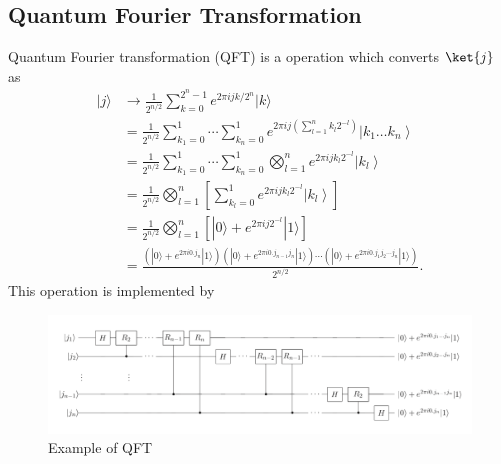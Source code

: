 \documentclass[b5paper,papersize,dvipdfmx,fleqn]{article}
\begin{document}
\subsection{Quantum Fourier Transformation}
Quantum Fourier transformation (QFT) is a operation which converts $\ket{j}$ as
$$
\begin{aligned}
|j\rangle & \rightarrow \frac{1}{2^{n / 2}} \sum_{k=0}^{2^{n}-1} e^{2 \pi i j k / 2^{n}}|k\rangle \\
&=\frac{1}{2^{n / 2}} \sum_{k_{1}=0}^{1} \cdots \sum_{k_{n}=0}^{1} e^{2 \pi i j\left(\sum_{l=1}^{n} k_{l} 2^{-l}\right)}\left|k_{1} \ldots k_{n}\right\rangle \\
&=\frac{1}{2^{n / 2}} \sum_{k_{1}=0}^{1} \cdots \sum_{k_{n}=0}^{1} \bigotimes_{l=1}^{n} e^{2 \pi i j k_{l} 2^{-l}}\left|k_{l}\right\rangle \\
&=\frac{1}{2^{n / 2}} \bigotimes_{l=1}^{n}\left[\sum_{k_{l}=0}^{1} e^{2 \pi i j k_{l} 2^{-l}}\left|k_{l}\right\rangle\right] \\
&=\frac{1}{2^{n / 2}} \bigotimes_{l=1}^{n}\left[|0\rangle+e^{2 \pi i j 2^{-l}}|1\rangle\right] \\
&=\frac{\left(|0\rangle+e^{2 \pi i 0 . j_{n}}|1\rangle\right)\left(|0\rangle+e^{2 \pi i 0 . j_{n-1} j_{n}}|1\rangle\right) \cdots\left(|0\rangle+e^{2 \pi i 0 . j_{1} j_{2} \cdots j_{n}}|1\rangle\right)}{2^{n / 2}} .
\end{aligned}
$$
This operation is implemented by
\begin{center}
  \begin{figure}[H]
       \includegraphics[width=\textwidth]{qft.pdf}
       \caption{Example of QFT}
       \label{circuit}
  \end{figure}
\end{center}
\end{document}

